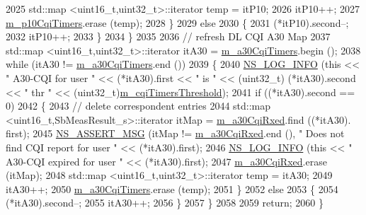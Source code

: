 \begin{DoxyCode}
2025           std::map <uint16\_t,uint32\_t>::iterator temp = itP10;
2026           itP10++;
2027           \hyperlink{classns3_1_1FdBetFfMacScheduler_ab8a2a1181e0beecba1ec83576b9ff043}{m\_p10CqiTimers}.erase (temp);
2028         \}
2029       \textcolor{keywordflow}{else}
2030         \{
2031           (*itP10).second--;
2032           itP10++;
2033         \}
2034     \}
2035 
2036   \textcolor{comment}{// refresh DL CQI A30 Map}
2037   std::map <uint16\_t,uint32\_t>::iterator itA30 = \hyperlink{classns3_1_1FdBetFfMacScheduler_a8a887ae2aea7f983bb40f3effd776c25}{m\_a30CqiTimers}.begin ();
2038   \textcolor{keywordflow}{while} (itA30 != \hyperlink{classns3_1_1FdBetFfMacScheduler_a8a887ae2aea7f983bb40f3effd776c25}{m\_a30CqiTimers}.end ())
2039     \{
2040       \hyperlink{group__logging_gafbd73ee2cf9f26b319f49086d8e860fb}{NS\_LOG\_INFO} (\textcolor{keyword}{this} << \textcolor{stringliteral}{" A30-CQI for user "} << (*itA30).first << \textcolor{stringliteral}{" is "} << (uint32\_t)
      (*itA30).second << \textcolor{stringliteral}{" thr "} << (uint32\_t)\hyperlink{classns3_1_1FdBetFfMacScheduler_ad25e8d5207cfa78201a9af0d38aab817}{m\_cqiTimersThreshold});
2041       \textcolor{keywordflow}{if} ((*itA30).second == 0)
2042         \{
2043           \textcolor{comment}{// delete correspondent entries}
2044           std::map <uint16\_t,SbMeasResult\_s>::iterator itMap = \hyperlink{classns3_1_1FdBetFfMacScheduler_ab5e71846932710964119a81bccdbd602}{m\_a30CqiRxed}.find ((*itA30).
      first);
2045           \hyperlink{assert_8h_aff5ece9066c74e681e74999856f08539}{NS\_ASSERT\_MSG} (itMap != \hyperlink{classns3_1_1FdBetFfMacScheduler_ab5e71846932710964119a81bccdbd602}{m\_a30CqiRxed}.end (), \textcolor{stringliteral}{" Does not find CQI report
       for user "} << (*itA30).first);
2046           \hyperlink{group__logging_gafbd73ee2cf9f26b319f49086d8e860fb}{NS\_LOG\_INFO} (\textcolor{keyword}{this} << \textcolor{stringliteral}{" A30-CQI expired for user "} << (*itA30).first);
2047           \hyperlink{classns3_1_1FdBetFfMacScheduler_ab5e71846932710964119a81bccdbd602}{m\_a30CqiRxed}.erase (itMap);
2048           std::map <uint16\_t,uint32\_t>::iterator temp = itA30;
2049           itA30++;
2050           \hyperlink{classns3_1_1FdBetFfMacScheduler_a8a887ae2aea7f983bb40f3effd776c25}{m\_a30CqiTimers}.erase (temp);
2051         \}
2052       \textcolor{keywordflow}{else}
2053         \{
2054           (*itA30).second--;
2055           itA30++;
2056         \}
2057     \}
2058 
2059   \textcolor{keywordflow}{return};
2060 \}
\end{DoxyCode}


